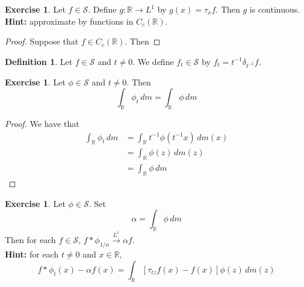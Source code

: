 \documentclass[12pt]{amsart}
\theoremstyle{definition}
\newtheorem{defn}[definition]{Definition}
\newtheorem{ex}[definition]{Exercise}
\newcommand{\al}{\alpha}
\newcommand{\del}{\delta}
\newcommand{\R}{\mathbb{R}}
\newcommand{\MS}{\mathcal{S}}
\newcommand{\dm}{\, d m}
\newcommand{\conv}[1]{\xrightarrow{#1}}
\begin{document}
	\begin{ex}
		Let $f \in \MS$. Define $g: \R \rightarrow L^1$ by $g(x) = \tau_x f$. Then $g$ is continuous. \\
		\textbf{Hint:} approximate by functions in $C_c(\R)$.
	\end{ex}

	\begin{proof}
		Suppose that $f \in C_c(\R)$. Then
	\end{proof}

	\begin{defn}
		Let $f \in \MS$ and $t \neq 0$. We define $f_t \in \MS$ by $f_t = t^{-1} \del_{t^{-1}} f$.   
	\end{defn}

	\begin{ex}
		Let $\phi \in \MS$ and $t \neq 0$. Then 
		$$\int_{\R}\phi_t \dm = \int_{\R} \phi \dm$$ 
	\end{ex}

	\begin{proof}
		We have that 
		\begin{align*}
			\int_{\R}\phi_t \dm 
			& = \int_{\R}t^{-1}\phi(t^{-1}x) \dm(x) \\
			& = \int_{\R} \phi(z) \dm(z) \\
			& = \int_{\R}\phi \dm 
		\end{align*}
	\end{proof}

	\begin{ex}
		Let $\phi \in \MS$. Set 
		$$\al = \int_{\R} \phi \dm$$ 
		Then for each $f \in \MS$,  $f * \phi_{1/n} \conv{L^1} \al f$. \\
		\textbf{Hint:} for each $t \neq 0$ and $x \in \R$, 
		$$f * \phi_t(x) - \al f(x) = \int_{\R} [\tau_{tz}f(x)  -  f(x)] \phi(z) \dm(z) $$
	\end{ex}
\end{document}
